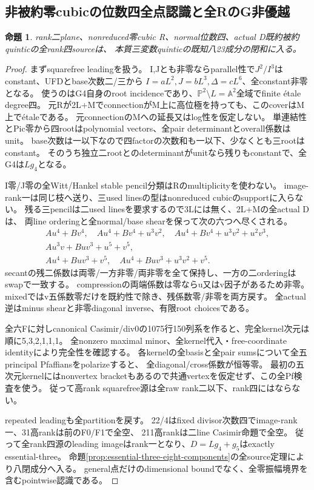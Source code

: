 \documentclass[a4paper,11pt]{ltjsarticle}
\newtheorem{proposition}{命題}[section]
\theoremstyle{definition}
\begin{document}
\subsection{非被約零cubicの位数四全点認識と全RのG非優越}
\begin{proposition}\label{prop:plane-m4-nonreduced-all-eight}
rank二plane、nonreduced零cubic R、normal位数四、actual D既約被約quinticの全rank四sourceは、
本質三変数quinticの既知八23成分の閉和に入る。
\end{proposition}
\begin{proof}
まずsquarefree leadingを扱う。
I,Jとも非零ならparallel性で$J^2/I^3$はconstant、UFDとbase次数二/三から
$I=aL^2,J=bL^3,\Delta=cL^6$、全constant非零となる。
使うのはG4自身のroot incidenceであり、$\mathbb P^2\setminus L=\mathbb A^2$全域でfinite \'etale degree四。
元Rが2L+MでconnectionがM上に高位極を持っても、このcoverはM上で\'etaleである。
元connectionのMへの延長又はlog性を仮定しない。
単連結性とPic零から四rootはpolynomial vectors、全pair determinantとoverall係数はunit。
base次数は一以下なので四factorの次数和も一以下、少なくとも三rootはconstant。
そのうち独立二rootとのdeterminantがunitなら残りもconstantで、全G4は$Lg_4$となる。

I零/J零の全Witt/Hankel stable pencil分類はRのmultiplicityを使わない。
image-rank一は同じ枝へ送り、三used linesの型はnonreduced cubicのsupportに入らない。
残る三pencilは二used linesを要求するので3Lには無く、2L+Mの全actual Dは、
両line orderingと全normal/base shearを保って次の六つへ尽くされる。
\[
\begin{gathered}
 Au^4+Bv^4,\quad Au^4+Bv^4+u^3v^2,\quad Au^4+Bv^4+u^3v^2+u^2v^3,\\
 Au^3v+Buv^3+u^5+v^5,\\
 Au^4+Buv^3+v^5,\quad Au^4+Buv^3+u^3v^2+v^5.
\end{gathered}
\]
secantの残二係数は両零/一方非零/両非零を全て保持し、一方の二orderingはswapで一致する。
compressionの両端係数は零ならu又はv因子があるため非零。
mixedではv五係数零だけを既約性で除き、残係数零/非零を両方戻す。
全actual逆はminus shearと非零diagonal inverse、有限root choicesである。

全六Fに対しcanonical Casimir/div0の1075行150列系を作ると、完全kernel次元は順に5,3,2,1,1,1。
全nonzero maximal minor、全kernel代入・free-coordinate identityにより完全性を確認する。
各kernelの全basisと全pair sumsについて全五principal Pfaffiansをpolarizeすると、
全diagonal/cross係数が恒等零。
最初の五次元kernelにはnonvertex bracketもあるので共通vertexを仮定せず、この全Pf検査を使う。
従って高rank squarefree源は全raw rank二以下、rank四にはならない。

repeated leadingも全partitionを戻す。
22/4はfixed divisor次数四でimage-rank一、31高rankは前のF0/F1で全空、
211高rankは二line Casimir命題で全空。
従って全rank四源のleading imageはrank一となり、$D=Lg_4+g_5$はexactly essential-three。
命題\ref{prop:essential-three-eight-components}の全source定理により八閉成分へ入る。
general点だけのdimensional boundでなく、全零振幅境界を含むpointwise認識である。
\end{proof}
\end{document}
